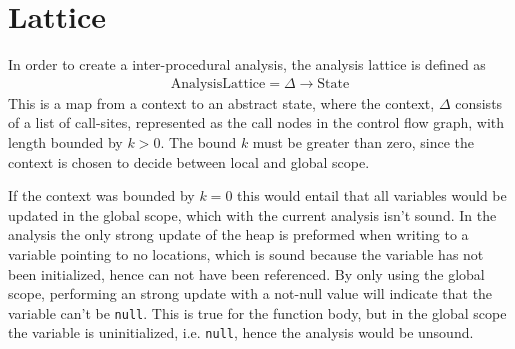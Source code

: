
\section{Lattice}
\label{sec:lattice}
In order to create a inter-procedural analysis, the analysis lattice is defined as
\begin{align}
\text{AnalysisLattice} = \Delta \rightarrow \text{State}
\end{align}
This is a map from a context to an abstract state, where the context, $\Delta$ consists of a list of call-sites, represented as the call nodes in the control flow graph, with length bounded by $k>0$. The bound $k$ must be greater than zero, since the context is chosen to decide between local and global scope. 

If the context was bounded by $k=0$ this would entail that all variables would be updated in the global scope, which with the current analysis isn't sound. In the analysis the only strong update of the heap is preformed when writing to a variable pointing to no locations, which is sound because the variable has not been initialized, hence can not have been referenced. By only using the global scope, performing an strong update with a not-null value will indicate that the variable can't be \texttt{null}. This is true for the function body, but in the global scope the variable is uninitialized, i.e. \texttt{null}, hence the analysis would be unsound.

